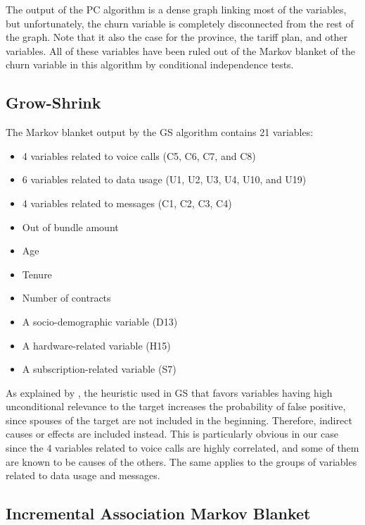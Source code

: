 The output of the PC algorithm is a dense graph linking most of the variables,
but unfortunately, the churn variable is completely disconnected from the rest
of the graph. Note that it also the case for the province, the tariff plan, and
other variables. All of these variables have been ruled out of the Markov
blanket of the churn variable in this algorithm by conditional independence
tests.

\subsection{Grow-Shrink}

The Markov blanket output by the GS algorithm contains 21 variables:

\begin{itemize}
    \item 4 variables related to voice calls (C5, C6, C7, and C8)
    \item 6 variables related to data usage (U1, U2, U3, U4, U10, and U19)
    \item 4 variables related to messages (C1, C2, C3, C4)
    \item Out of bundle amount
    \item Age
    \item Tenure
    \item Number of contracts
    \item A socio-demographic variable (D13)
    \item A hardware-related variable (H15)
    \item A subscription-related variable (S7)
\end{itemize}

As explained by \textcite{tsamardinos2003algorithms}, the heuristic used in GS
that favors variables having high unconditional relevance to the target
increases the probability of false positive, since spouses of the target are not
included in the beginning. Therefore, indirect causes or effects are included
instead. This is particularly obvious in our case since the 4 variables related
to voice calls are highly correlated, and some of them are known to be causes of
the others. The same applies to the groups of variables related to data usage and
messages.

\subsection{Incremental Association Markov Blanket}

